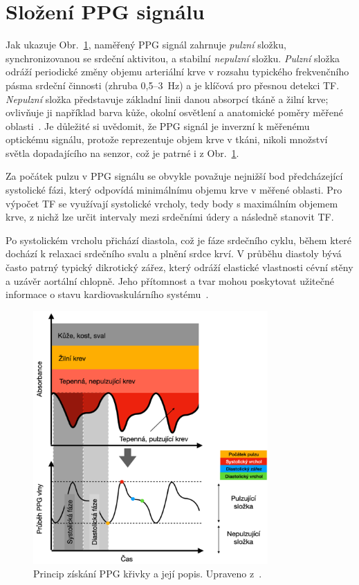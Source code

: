 \section{Složení \acs{PPG} signálu}

Jak ukazuje Obr.~\ref{fig:signalPPG}, naměřený \acs{PPG} signál zahrnuje \textit{pulzní} složku, synchronizovanou se srdeční aktivitou, a stabilní \textit{nepulzní} složku.
\textit{Pulzní} složka odráží periodické změny objemu arteriální krve v rozsahu typického frekvenčního pásma srdeční činnosti (zhruba 0{,}5--3~Hz) a je klíčová pro přesnou detekci \acs{TF}.
\textit{Nepulzní} složka představuje základní linii danou absorpcí tkáně a žilní krve; ovlivňuje ji například barva kůže, okolní osvětlení a anatomické poměry měřené oblasti~\cite{ENIKÖ, Park2022}.
Je důležité si uvědomit, že \acs{PPG} signál je inverzní k měřenému optickému signálu, protože reprezentuje objem krve v tkáni, nikoli množství světla dopadajícího na senzor, což je patrné i z Obr.~\ref{fig:signalPPG}.

Za počátek pulzu v \acs{PPG} signálu se obvykle považuje nejnižší bod předcházející systolické fázi, který odpovídá minimálnímu objemu krve v měřené oblasti.
Pro výpočet \acs{TF} se využívají systolické vrcholy, tedy body s maximálním objemem krve, z nichž lze určit intervaly mezi srdečními údery a následně stanovit \acs{TF}.

Po systolickém vrcholu přichází diastola, což je fáze srdečního cyklu, během které dochází k relaxaci srdečního svalu a plnění srdce krví.
V průběhu diastoly bývá často patrný typický dikrotický zářez, který odráží elastické vlastnosti cévní stěny a uzávěr aortální chlopně.
Jeho přítomnost a tvar mohou poskytovat užitečné informace o stavu kardiovaskulárního systému~\cite{Orphanidou2018, Park2022}.

\begin{figure}[hb]
	\centering
	\includegraphics[width=0.8\textwidth]{./obrazky/signalPPG.png}
	\caption[Fiziologický popis PPG signálu]{Princip získání \acs{PPG} křivky a její popis. Upraveno z~\cite{Park2022}.}
	\label{fig:signalPPG}
\end{figure}